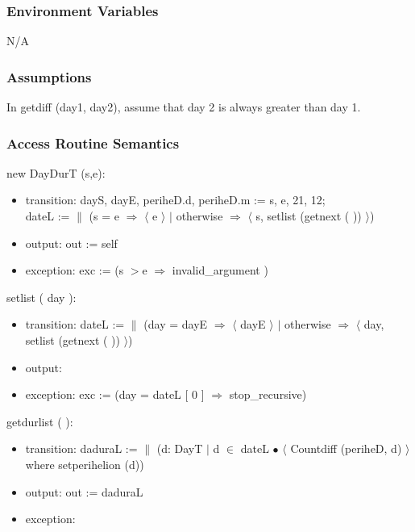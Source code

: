 \documentclass[12pt, titlepage]{article}
\begin{document}
\subsubsection{Environment Variables}

N/A\\

\subsubsection{Assumptions}
In  getdiff (day1, day2), assume that day 2 is always greater than day 1.

\subsubsection{ Access Routine Semantics}

\noindent  new DayDurT (s,e):
\begin{itemize}
\item transition:  dayS, dayE, periheD.d,  periheD.m := s, e, 21, 12;\\

dateL := $\|$ (s = e $\Rightarrow$ $\langle$ e $\rangle$ $|$ otherwise $\Rightarrow$ $\langle$ s, setlist (getnext ( )) $\rangle$) 

\item output: out := self
\item exception: exc := (s $>$e $\Rightarrow$ invalid\_argument )
\end{itemize}

\noindent  setlist ( day ):
\begin{itemize}
\item transition: dateL := $\|$ (day = dayE $\Rightarrow$ $\langle$ dayE $\rangle$ $|$ otherwise $\Rightarrow$ $\langle$ day, setlist (getnext ( )) $\rangle$) 
\item output: 
\item exception: exc :=  (day = dateL [ 0 ] $\Rightarrow$ stop\_recursive)
\end{itemize}

\noindent  getdurlist ( ):
\begin{itemize}
\item transition: daduraL := $\|$ (d: DayT $|$ d $\in$ dateL  $\bullet$ $\langle$ Countdiff (periheD, d) $\rangle$ where setperihelion (d)) 
\item output: out := daduraL
\item exception:
\end{itemize}
\end{document}
